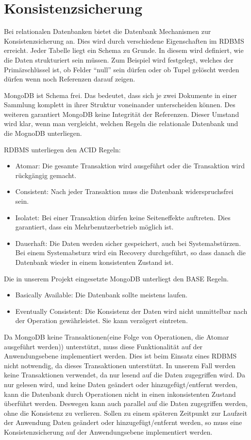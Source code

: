  \section{Konsistenzsicherung}
 Bei relationalen Datenbanken bietet die Datenbank Mechanismen zur
 Konsistenzsicherung an. Dies wird durch verschiedene Eigenschaften im RDBMS
 erreicht. Jeder Tabelle liegt ein Schema zu Grunde. In diesem wird definiert,
 wie die Daten strukturiert sein müssen. Zum Beispiel wird festgelegt, welches
 der Primärschlüssel ist, ob Felder ``null'' sein dürfen oder ob Tupel gelöscht
 werden dürfen wenn noch Referenzen darauf zeigen.
 
 MongoDB ist Schema frei. Das bedeutet, dass sich je zwei Dokumente in einer
Sammlung  komplett in ihrer Struktur voneinander unterscheiden können.
 Des weiteren garantiert MongoDB keine Integrität der Referenzen. Dieser Umstand
 wird klar, wenn man vergleicht, welchen Regeln die relationale Datenbank und
 die MognoDB unterliegen.
 
 RDBMS unterliegen den ACID Regeln:
 \begin{itemize}
   \item Atomar: Die gesamte Transaktion wird ausgeführt oder die Transaktion
   wird rückgängig gemacht.
   \item Consistent: Nach jeder Transaktion muss die Datenbank widerspruchsfrei
   sein.
   \item Isolatet: Bei einer Transaktion dürfen keine Seiteneffekte
   auftreten. Dies garantiert, dass ein Mehrbenutzerbetrieb möglich ist.
   \item Dauerhaft: Die Daten werden sicher gespeichert, auch bei
   Systemabstürzen. Bei einem Systemabsturz wird ein Recovery durchgeführt, so 
   dass danach die Datenbank wieder in einem konsistenten Zustand ist.
 \end{itemize}
 Die in unserem Projekt eingesetzte MongoDB unterliegt den BASE Regeln.
 \begin{itemize}
   \item Basically Available: Die Datenbank sollte meistens laufen.
   \item Eventually Consistent: Die Konsistenz der Daten wird nicht unmittelbar
   nach der Operation gewährleistet. Sie kann verzögert eintreten.
\end{itemize}

Da MongoDB keine Transaktionen(eine Folge von Operationen, die Atomar
ausgeführt werden)) unterstützt, muss diese Funktionalität auf der
Anwendungsebene implementiert werden. Dies ist beim Einsatz eines RDBMS nicht
notwendig, da dieses Transaktionen unterstützt. In unserem Fall werden keine
Transaktionen verwendet, da nur lesend auf die Daten zugegriffen wird.
Da nur gelesen wird, und keine Daten geändert oder hinzugefügt/entfernt werden,
kann die Datenbank durch Operationen nicht in einen inkonsistenten Zustand
überführt werden. Deswegen kann auch parallel auf die Daten zugegriffen
werden, ohne die Konsistenz zu verlieren. Sollen zu einem späteren Zeitpunkt zur
Laufzeit der Anwendung Daten geändert oder hinzugefügt/entfernt werden,
 so muss eine Konsistenzsicherung auf der Anwendungsebene  implementiert werden.


 

		